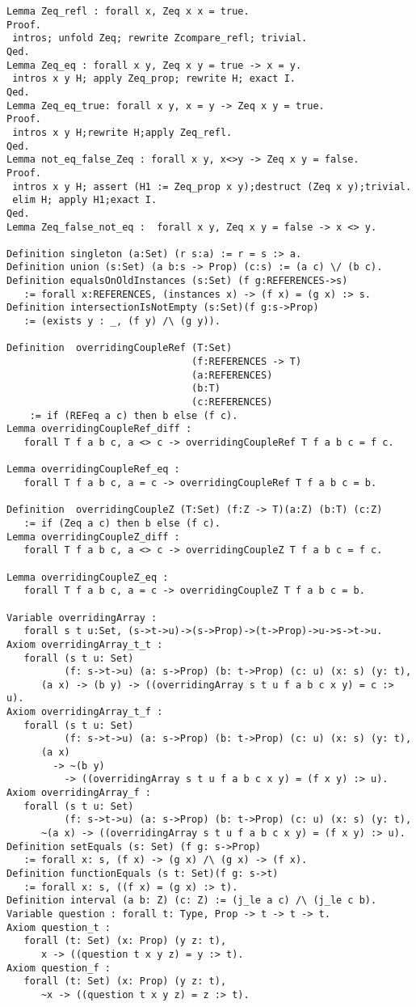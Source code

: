 \begin{verbatim}
Lemma Zeq_refl : forall x, Zeq x x = true.
Proof.
 intros; unfold Zeq; rewrite Zcompare_refl; trivial.
Qed.
Lemma Zeq_eq : forall x y, Zeq x y = true -> x = y.
 intros x y H; apply Zeq_prop; rewrite H; exact I.
Qed.
Lemma Zeq_eq_true: forall x y, x = y -> Zeq x y = true.
Proof.
 intros x y H;rewrite H;apply Zeq_refl.
Qed.
Lemma not_eq_false_Zeq : forall x y, x<>y -> Zeq x y = false.
Proof.
 intros x y H; assert (H1 := Zeq_prop x y);destruct (Zeq x y);trivial.
 elim H; apply H1;exact I.
Qed.
Lemma Zeq_false_not_eq :  forall x y, Zeq x y = false -> x <> y.

Definition singleton (a:Set) (r s:a) := r = s :> a.
Definition union (s:Set) (a b:s -> Prop) (c:s) := (a c) \/ (b c).
Definition equalsOnOldInstances (s:Set) (f g:REFERENCES->s) 
   := forall x:REFERENCES, (instances x) -> (f x) = (g x) :> s.
Definition intersectionIsNotEmpty (s:Set)(f g:s->Prop)
   := (exists y : _, (f y) /\ (g y)).

Definition  overridingCoupleRef (T:Set) 
                                (f:REFERENCES -> T)
                                (a:REFERENCES) 
                                (b:T) 
                                (c:REFERENCES) 
    := if (REFeq a c) then b else (f c).
Lemma overridingCoupleRef_diff : 
   forall T f a b c, a <> c -> overridingCoupleRef T f a b c = f c.

Lemma overridingCoupleRef_eq : 
   forall T f a b c, a = c -> overridingCoupleRef T f a b c = b.

Definition  overridingCoupleZ (T:Set) (f:Z -> T)(a:Z) (b:T) (c:Z) 
   := if (Zeq a c) then b else (f c).
Lemma overridingCoupleZ_diff : 
   forall T f a b c, a <> c -> overridingCoupleZ T f a b c = f c.

Lemma overridingCoupleZ_eq : 
   forall T f a b c, a = c -> overridingCoupleZ T f a b c = b. 

Variable overridingArray : 
   forall s t u:Set, (s->t->u)->(s->Prop)->(t->Prop)->u->s->t->u.
Axiom overridingArray_t_t : 
   forall (s t u: Set) 
          (f: s->t->u) (a: s->Prop) (b: t->Prop) (c: u) (x: s) (y: t), 
      (a x) -> (b y) -> ((overridingArray s t u f a b c x y) = c :> u).
Axiom overridingArray_t_f : 
   forall (s t u: Set) 
          (f: s->t->u) (a: s->Prop) (b: t->Prop) (c: u) (x: s) (y: t), 
      (a x) 
        -> ~(b y) 
          -> ((overridingArray s t u f a b c x y) = (f x y) :> u).
Axiom overridingArray_f : 
   forall (s t u: Set) 
          (f: s->t->u) (a: s->Prop) (b: t->Prop) (c: u) (x: s) (y: t), 
      ~(a x) -> ((overridingArray s t u f a b c x y) = (f x y) :> u).
Definition setEquals (s: Set) (f g: s->Prop) 
   := forall x: s, (f x) -> (g x) /\ (g x) -> (f x).
Definition functionEquals (s t: Set)(f g: s->t) 
   := forall x: s, ((f x) = (g x) :> t).
Definition interval (a b: Z) (c: Z) := (j_le a c) /\ (j_le c b).
Variable question : forall t: Type, Prop -> t -> t -> t.
Axiom question_t : 
   forall (t: Set) (x: Prop) (y z: t), 
      x -> ((question t x y z) = y :> t).
Axiom question_f : 
   forall (t: Set) (x: Prop) (y z: t), 
      ~x -> ((question t x y z) = z :> t).



\end{verbatim}
